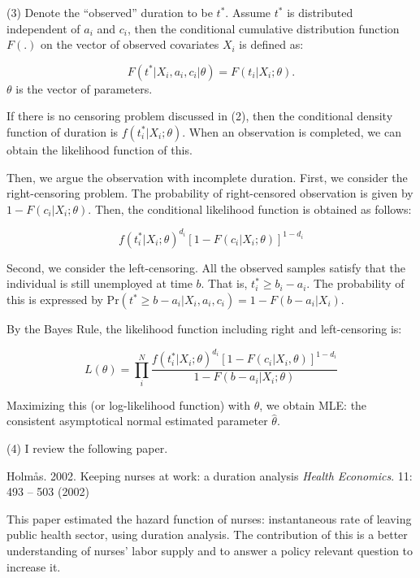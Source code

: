 \documentclass[dvipdfmx, 12pt]{article}
\begin{document}
\vspace{1zw}
(3) Denote the ``observed'' duration to be $t^*$. Assume $t^*$ is distributed independent of $a_i$ and $c_i$, then the conditional cumulative distribution function $F(.)$ on the vector of observed covariates $X_i$ is defined as:

\[
F(t^* | X_i, a_i, c_i | \theta) = F(t_i | X_i; \theta).
\]
$\theta$ is the vector of parameters.

If there is no censoring problem discussed in (2), then the conditional density function of duration is $f(t^*_i | X_i; \theta)$. When an observation is completed, we can obtain the likelihood function of this.

Then, we argue the observation with incomplete duration. First, we consider the right-censoring problem. The probability of  right-censored observation is given by $1 - F(c_i | X_i; \theta)$. Then, the conditional likelihood function is obtained as follows:

\[
f(t_i^* | X_i; \theta)^{d_i} [1 - F(c_i | X_i; \theta)]^{1 - d_i}
\]

Second, we consider the left-censoring. All the observed samples satisfy that the individual is still unemployed at time $b$. That is, $t^*_i \geq b_i - a_i$. The probability of this is expressed by $\text{Pr}(t^* \geq b - a_i | X_i, a_i, c_i) = 1 - F(b - a_i | X_i)$.

By the Bayes Rule, the likelihood function including right and left-censoring is:

\[
L(\theta) = \prod_i^N \dfrac{f(t^*_i | X_i; \theta)^{d_i} [1 - F (c_i | X_i, \theta)]^{1 - d_i}}{1 - F(b - a_i | X_i; \theta)}
\]

Maximizing this (or log-likelihood function) with $\theta$, we obtain MLE: the consistent asymptotical normal estimated parameter $\hat{\theta}$.

\vspace{1zw}
(4) I review the following paper.

Holm\r{a}s. 2002. Keeping nurses at work: a duration analysis \textit{Health Economics}. 11: 493 -- 503 (2002)

\vspace{1zw}

This paper estimated the hazard function of nurses: instantaneous rate of leaving public health sector, using duration analysis. The contribution of this is a better understanding of nurses' labor supply and to answer a policy relevant question to increase it.

\vspace{0.7zw}
\end{document}
